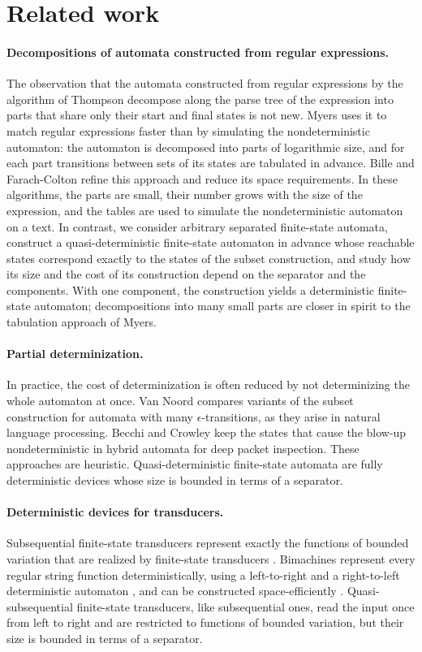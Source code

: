 \section{Related work}

\paragraph{Decompositions of automata constructed from regular expressions.}
The observation that the automata constructed from regular expressions by the algorithm
of Thompson \cite{thompson} decompose along the parse tree of the expression into parts
that share only their start and final states is not new. Myers \cite{myers} uses it to
match regular expressions faster than by simulating the nondeterministic automaton: the
automaton is decomposed into parts of logarithmic size, and for each part transitions
between sets of its states are tabulated in advance. Bille and Farach-Colton
\cite{bille_farach_colton} refine this approach and reduce its space requirements. In
these algorithms, the parts are small, their number grows with the size of the
expression, and the tables are used to simulate the nondeterministic automaton on a
text. In contrast, we consider arbitrary separated finite-state automata, construct a
quasi-deterministic finite-state automaton in advance whose reachable states correspond
exactly to the states of the subset construction, and study how its size and the cost
of its construction depend on the separator and the components. With one component,
the construction yields a deterministic finite-state automaton; decompositions into
many small parts are closer in spirit to the tabulation approach of Myers.

\paragraph{Partial determinization.}
In practice, the cost of determinization is often reduced by not determinizing the whole
automaton at once. Van Noord \cite{van_noord} compares variants of the subset
construction for automata with many $\epsilon$-transitions, as they arise in natural
language processing. Becchi and Crowley \cite{becchi_crowley} keep the states that
cause the blow-up nondeterministic in hybrid automata for deep packet inspection. These
approaches are heuristic. Quasi-deterministic finite-state automata are fully
deterministic devices whose size is bounded in terms of a separator.

\paragraph{Deterministic devices for transducers.}
Subsequential finite-state transducers represent exactly the functions of bounded
variation that are realized by finite-state transducers \cite{mohri_applications}.
Bimachines represent every regular string function deterministically, using a
left-to-right and a right-to-left deterministic automaton \cite{mihov_schulz}, and can be
constructed space-efficiently \cite{gerdjikov_mihov_schulz}. Quasi-subsequential
finite-state transducers, like subsequential ones, read the input once from left to
right and are restricted to functions of bounded variation, but their size is bounded in
terms of a separator.
